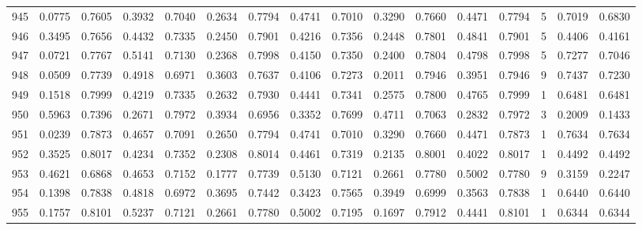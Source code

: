\begin{tabular}{lrrrrrrrrrrrrrrr}
945 &      0.0775 &  0.7605 &  0.3932 &  0.7040 &  0.2634 &  0.7794 &  0.4741 &  0.7010 &  0.3290 &  0.7660 &   0.4471 &     0.7794 &      5 &                    0.7019 &                     0.6830 \\
946 &      0.3495 &  0.7656 &  0.4432 &  0.7335 &  0.2450 &  0.7901 &  0.4216 &  0.7356 &  0.2448 &  0.7801 &   0.4841 &     0.7901 &      5 &                    0.4406 &                     0.4161 \\
947 &      0.0721 &  0.7767 &  0.5141 &  0.7130 &  0.2368 &  0.7998 &  0.4150 &  0.7350 &  0.2400 &  0.7804 &   0.4798 &     0.7998 &      5 &                    0.7277 &                     0.7046 \\
948 &      0.0509 &  0.7739 &  0.4918 &  0.6971 &  0.3603 &  0.7637 &  0.4106 &  0.7273 &  0.2011 &  0.7946 &   0.3951 &     0.7946 &      9 &                    0.7437 &                     0.7230 \\
949 &      0.1518 &  0.7999 &  0.4219 &  0.7335 &  0.2632 &  0.7930 &  0.4441 &  0.7341 &  0.2575 &  0.7800 &   0.4765 &     0.7999 &      1 &                    0.6481 &                     0.6481 \\
950 &      0.5963 &  0.7396 &  0.2671 &  0.7972 &  0.3934 &  0.6956 &  0.3352 &  0.7699 &  0.4711 &  0.7063 &   0.2832 &     0.7972 &      3 &                    0.2009 &                     0.1433 \\
951 &      0.0239 &  0.7873 &  0.4657 &  0.7091 &  0.2650 &  0.7794 &  0.4741 &  0.7010 &  0.3290 &  0.7660 &   0.4471 &     0.7873 &      1 &                    0.7634 &                     0.7634 \\
952 &      0.3525 &  0.8017 &  0.4234 &  0.7352 &  0.2308 &  0.8014 &  0.4461 &  0.7319 &  0.2135 &  0.8001 &   0.4022 &     0.8017 &      1 &                    0.4492 &                     0.4492 \\
953 &      0.4621 &  0.6868 &  0.4653 &  0.7152 &  0.1777 &  0.7739 &  0.5130 &  0.7121 &  0.2661 &  0.7780 &   0.5002 &     0.7780 &      9 &                    0.3159 &                     0.2247 \\
954 &      0.1398 &  0.7838 &  0.4818 &  0.6972 &  0.3695 &  0.7442 &  0.3423 &  0.7565 &  0.3949 &  0.6999 &   0.3563 &     0.7838 &      1 &                    0.6440 &                     0.6440 \\
955 &      0.1757 &  0.8101 &  0.5237 &  0.7121 &  0.2661 &  0.7780 &  0.5002 &  0.7195 &  0.1697 &  0.7912 &   0.4441 &     0.8101 &      1 &                    0.6344 &                     0.6344 \\

\end{tabular}
